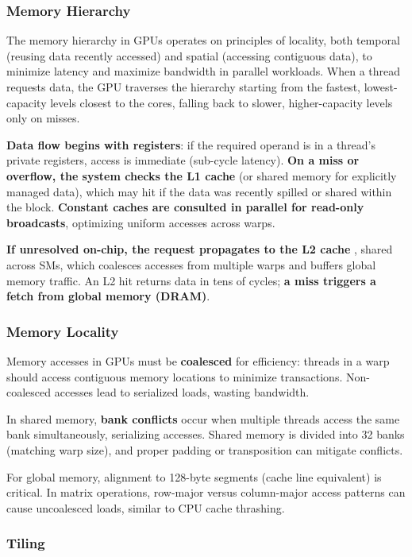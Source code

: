 \subsubsection*{Memory Hierarchy}

The memory hierarchy in GPUs operates on principles of locality, both temporal (reusing data recently accessed) and spatial (accessing contiguous data), to minimize latency and maximize bandwidth in parallel workloads. When a thread requests data, the GPU traverses the hierarchy starting from the fastest, lowest-capacity levels closest to the cores, falling back to slower, higher-capacity levels only on misses.

\textbf{Data flow begins with registers}: if the required operand is in a thread's private registers, access is immediate (sub-cycle latency). \textbf{On a miss or overflow, the system checks the L1 cache} \cite{CPUcacheL1} (or shared memory for explicitly managed data), which may hit if the data was recently spilled or shared within the block. \textbf{Constant caches are consulted in parallel for read-only broadcasts}, optimizing uniform accesses across warps.

\textbf{If unresolved on-chip, the request propagates to the L2 cache} \cite{GPUcacheL2Global}, shared across SMs, which coalesces accesses from multiple warps and buffers global memory traffic. An L2 hit returns data in tens of cycles; \textbf{a miss triggers a fetch from global memory (DRAM)}.


\subsubsection*{Memory Locality}

Memory accesses in GPUs must be \textbf{coalesced} for efficiency: threads in a warp should access contiguous memory locations to minimize transactions. Non-coalesced accesses lead to serialized loads, wasting bandwidth.

In shared memory, \textbf{bank conflicts} occur when multiple threads access the same bank simultaneously, serializing accesses. Shared memory is divided into 32 banks (matching warp size), and proper padding or transposition can mitigate conflicts.

For global memory, alignment to 128-byte segments (cache line equivalent) is critical. In matrix operations, row-major versus column-major access patterns can cause uncoalesced loads, similar to CPU cache thrashing.

\subsubsection*{Tiling}

